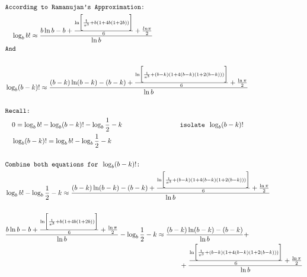 \documentclass[fleqn, a4paper,12pt]{article}
\begin{document}
\small
\[
\begin{aligned}
& \\
& \texttt{According to Ramanujan's Approximation: } \\
& \quad \log_bb! \approx \frac{b\ln b - b + \frac{\ln\biggl[\frac{1}{\pi^3} + b(1+4b(1+2b)) \biggr]}{6} + \frac{ln\pi}{2}}{\ln b} \\
& \texttt{And} \\
& \\
& \log_b(b-k)! \approx \frac{(b-k)\ln(b-k) - (b-k) + \frac{\ln \biggl[\frac{1}{\pi^3} +  (b-k)(1+4(b-k)(1+2(b-k)))\biggr]}{6} + \frac{\ln\pi}{2}}{\ln b} \\
& \\
& \texttt{Recall: } \\
& \quad 0 = \log_bb! - \log_b(b-k)! - \log_b\frac{1}{2} - k \hspace{2.8cm} \texttt{ isolate } \log_b(b-k)! \\
& \quad \log_b(b-k)! = \log_bb! - \log_b\frac{1}{2} - k \\
& \\
& \texttt{Combine both equations for } \log_b(b-k)! \texttt{: } \\
& \log_bb! - \log_b\frac{1}{2} - k \approx \frac{(b-k)\ln(b-k) - (b-k) + \frac{\ln \biggl[\frac{1}{\pi^3} + (b-k)(1+4(b-k)(1+2(b-k)))\biggr]}{6} + \frac{\ln\pi}{2}}{\ln b} \\
& \\
& \frac{b\ln b - b + \frac{\ln\biggl[\frac{1}{\pi^3} +  b(1+4b(1+2b)) \biggr]}{6} + \frac{\ln\pi}{2}}{\ln b} - \log_b\frac{1}{2} - k \approx \frac{(b-k)\ln(b-k) - (b-k)}{\ln b} +  \\ 
& \hspace{9cm} + \frac{\frac{\ln \biggl[\frac{1}{\pi^3} +  (b-k)(1+4(b-k)(1+2(b-k))) \biggr]}{6} + \frac{\ln\pi}{2}}{\ln b} \\
\end{aligned}
\]
\end{document}
